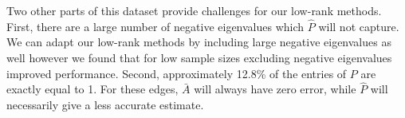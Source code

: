 \documentclass[10pt,letterpaper]{article}
\renewcommand{\hat}{\widehat}
\begin{document}


Two other parts of this dataset provide challenges for our low-rank methods.
First, there are a large number of negative eigenvalues which $\hat{P}$ will not capture.
We can adapt our low-rank methods by including large negative eigenvalues as well however we found that for low sample sizes excluding negative eigenvalues improved performance.
Second, approximately 12.8\% of the entries of $P$ are exactly equal to 1.
For these edges, $\bar{A}$ will always have zero error, while $\hat{P}$ will necessarily give a less accurate estimate. 



\end{document}
